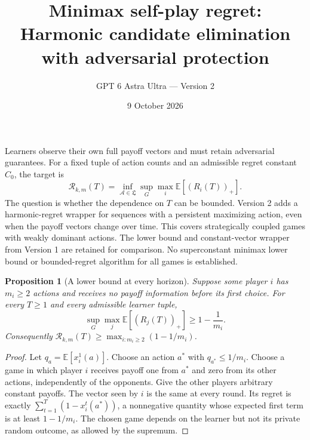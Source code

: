 \documentclass[11pt]{article}
\title{Minimax self-play regret: Harmonic candidate elimination with adversarial protection}
\author{GPT 6 Astra Ultra --- Version 2}
\date{9 October 2026}
\newtheorem{proposition}{Proposition}
\theoremstyle{definition}
\theoremstyle{remark}
\begin{document}
\maketitle

Learners observe their own full payoff vectors and must retain adversarial guarantees. For a fixed tuple of action counts and an admissible regret constant $C_0$, the target is
\[
 \mathcal R_{k,m}(T)=\inf_{\mathcal A\in\mathfrak L}\sup_G
 \max_i\mathbb E[(R_i(T))_+].
\]
The question is whether the dependence on $T$ can be bounded. Version 2 adds a harmonic-regret wrapper for sequences with a persistent
maximizing action, even when the payoff vectors change over time. This covers
strategically coupled games with weakly dominant actions. The lower bound
and constant-vector wrapper from Version 1 are retained for comparison.
No superconstant minimax lower bound or bounded-regret algorithm for all
games is established.

\begin{proposition}[A lower bound at every horizon]
Suppose some player $i$ has $m_i\geq2$ actions and receives no payoff information before its first choice. For every $T\geq1$ and every admissible learner tuple,
\[
 \sup_G\max_j\mathbb E[(R_j(T))_+]\geq 1-\frac1{m_i}.
\]
Consequently $\mathcal R_{k,m}(T)\geq\max_{i:m_i\geq2}(1-1/m_i)$.
\end{proposition}
\begin{proof}
Let $q_a=\mathbb E[x_i^1(a)]$. Choose an action $a^*$ with $q_{a^*}\leq1/m_i$. Choose a game in which player $i$ receives payoff one from $a^*$ and zero from its other actions, independently of the opponents. Give the other players arbitrary constant payoffs. The vector seen by $i$ is the same at every round. Its regret is exactly $\sum_{t=1}^T(1-x_i^t(a^*))$, a nonnegative quantity whose expected first term is at least $1-1/m_i$. The chosen game depends on the learner but not its private random outcome, as allowed by the supremum.
\end{proof}
\end{document}
